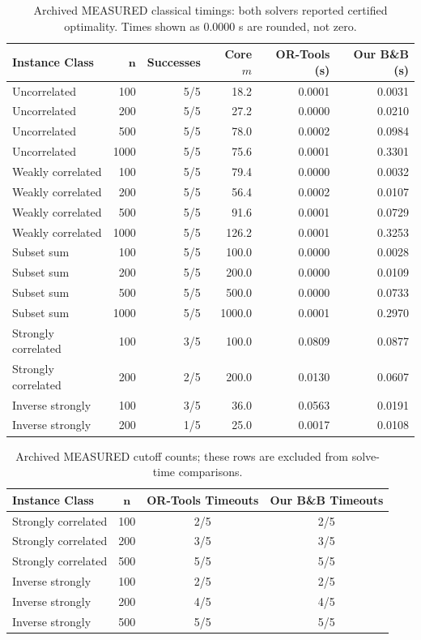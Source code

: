 \documentclass[pdflatex,sn-mathphys-num]{sn-jnl}
\begin{document}
\begin{table}[t]
\caption{Archived MEASURED classical timings: both solvers reported certified optimality. Times shown as 0.0000 s are rounded, not zero.}
\label{tab:ortools_cat_a}

\footnotesize
\begin{tabular}{@{}lrrrrr@{}}
\toprule
\textbf{Instance Class} & $\boldsymbol{n}$ & \textbf{Successes} & \textbf{Core $m$} & \textbf{OR-Tools (s)} & \textbf{Our B\&B (s)} \\
\midrule
Uncorrelated & 100 & 5/5 & 18.2 & 0.0001 & 0.0031 \\
Uncorrelated & 200 & 5/5 & 27.2 & 0.0000 & 0.0210 \\
Uncorrelated & 500 & 5/5 & 78.0 & 0.0002 & 0.0984 \\
Uncorrelated & 1000 & 5/5 & 75.6 & 0.0001 & 0.3301 \\
Weakly correlated & 100 & 5/5 & 79.4 & 0.0000 & 0.0032 \\
Weakly correlated & 200 & 5/5 & 56.4 & 0.0002 & 0.0107 \\
Weakly correlated & 500 & 5/5 & 91.6 & 0.0001 & 0.0729 \\
Weakly correlated & 1000 & 5/5 & 126.2 & 0.0001 & 0.3253 \\
Subset sum & 100 & 5/5 & 100.0 & 0.0000 & 0.0028 \\
Subset sum & 200 & 5/5 & 200.0 & 0.0000 & 0.0109 \\
Subset sum & 500 & 5/5 & 500.0 & 0.0000 & 0.0733 \\
Subset sum & 1000 & 5/5 & 1000.0 & 0.0001 & 0.2970 \\
Strongly correlated & 100 & 3/5 & 100.0 & 0.0809 & 0.0877 \\
Strongly correlated & 200 & 2/5 & 200.0 & 0.0130 & 0.0607 \\
Inverse strongly & 100 & 3/5 & 36.0 & 0.0563 & 0.0191 \\
Inverse strongly & 200 & 1/5 & 25.0 & 0.0017 & 0.0108 \\
\bottomrule
\end{tabular}

\end{table}

\begin{table}[htbp]
\caption{Archived MEASURED cutoff counts; these rows are excluded from solve-time comparisons.}
\label{tab:ortools_cat_b}

\begin{tabular}{lccc}
\toprule
\textbf{Instance Class} & $\boldsymbol{n}$ & \textbf{OR-Tools Timeouts} & \textbf{Our B\&B Timeouts} \\
\midrule
Strongly correlated & 100 & 2/5 & 2/5 \\
Strongly correlated & 200 & 3/5 & 3/5 \\
Strongly correlated & 500 & 5/5 & 5/5 \\
Inverse strongly & 100 & 2/5 & 2/5 \\
Inverse strongly & 200 & 4/5 & 4/5 \\
Inverse strongly & 500 & 5/5 & 5/5 \\
\bottomrule
\end{tabular}

\end{table}
\end{document}
